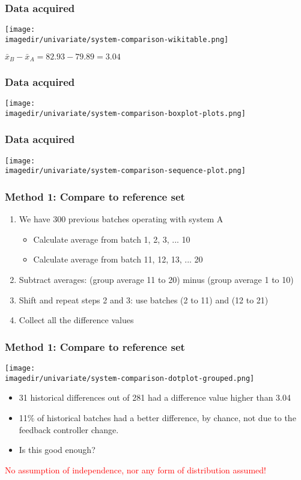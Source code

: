 \begin{frame}\frametitle{Data acquired}

	\texttt{[image: \\imagedir/univariate/system-comparison-wikitable.png]}

	$\bar{x}_B - \bar{x}_A = 82.93 - 79.89 = 3.04$
\end{frame}

\begin{frame}\frametitle{Data acquired}

	\texttt{[image: \\imagedir/univariate/system-comparison-boxplot-plots.png]}
\end{frame}

\begin{frame}\frametitle{Data acquired}

	\texttt{[image: \\imagedir/univariate/system-comparison-sequence-plot.png]}
\end{frame}

\begin{frame}\frametitle{Method 1: Compare to reference set}
	\begin{enumerate}
		\item We have 300 previous batches operating with system A
		\begin{itemize}
			\item Calculate average from batch 1, 2, 3, ... 10
			\item Calculate average from batch 11, 12, 13, ... 20
		\end{itemize}
		\item Subtract averages: (group average 11 to 20) minus (group average 1 to 10)
		\item Shift and repeat steps 2 and 3: use batches (2 to 11) and (12 to 21)
		\item Collect all the difference values
	\end{enumerate}
\end{frame}

\begin{frame}\frametitle{Method 1: Compare to reference set}

	\texttt{[image: \\imagedir/univariate/system-comparison-dotplot-grouped.png]}
	\begin{itemize}
		\item 31 historical differences out of 281 had a difference value higher than 3.04
		\item 11\% of historical batches had a better difference, by chance, not due to the feedback controller change. \pause
		\item Is this good enough?
	\end{itemize}

	\textcolor{red}{No assumption of independence, nor any form of distribution assumed!}
\end{frame}

